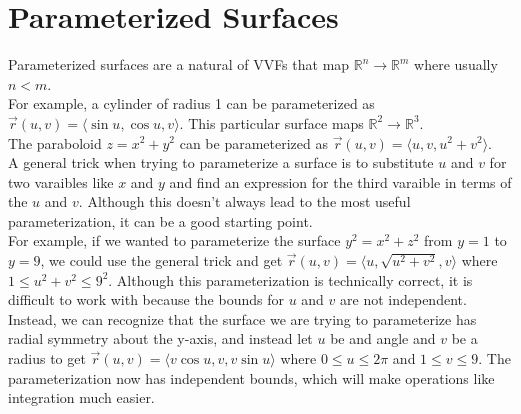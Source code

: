 \section{Parameterized Surfaces}
\noindent
Parameterized surfaces are a natural of VVFs that map $\mathbb{R}^n\to\mathbb{R}^m$ where usually $n<m$.\\

\noindent
For example, a cylinder of radius 1 can be parameterized as $\vec{r}(u,v)=\langle\sin{u},\cos{u},v\rangle$. This particular surface maps $\mathbb{R}^2\to\mathbb{R}^3$.\\
The paraboloid $z=x^2+y^2$ can be parameterized as $\vec{r}(u,v)=\langle u,v,u^2+v^2 \rangle$.\\

\noindent
A general trick when trying to parameterize a surface is to substitute $u$ and $v$ for two varaibles like $x$ and $y$ and find an expression for the third varaible in terms of the $u$ and $v$. Although this doesn’t always lead to the most useful parameterization, it can be a good starting point.\\

\noindent
For example, if we wanted to parameterize the surface $y^2=x^2+z^2$ from $y=1$ to $y=9$, we could use the general trick and get $\vec{r}(u,v)=\langle u,\sqrt{u^2+v^2},v\rangle$ where $1\leq u^2+v^2\leq 9^2$. Although this parameterization is technically correct, it is difficult to work with because the bounds for $u$ and $v$ are not independent.\\
Instead, we can recognize that the surface we are trying to parameterize has radial symmetry about the y-axis, and instead let $u$ be and angle and $v$ be a radius to get $\vec{r}(u,v)=\langle v\cos{u}, v, v\sin{u}\rangle$ where $0\leq u\leq 2\pi$ and $1\leq v\leq 9$. The parameterization now has independent bounds, which will make operations like integration much easier.
